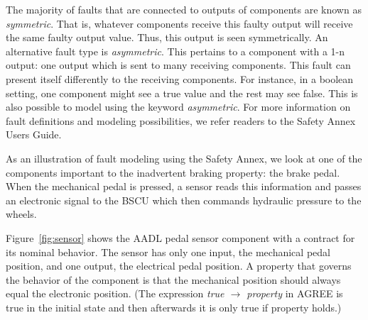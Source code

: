 The majority of faults that are connected to outputs of components are known as \textit{symmetric}. That is, whatever components receive this faulty output will receive the same faulty output value. Thus, this output is seen symmetrically. An alternative fault type is \textit{asymmetric}. This pertains to a component with a 1-n output: one output which is sent to many receiving components. This fault can present itself differently to the receiving components. For instance, in a boolean setting, one component might see a true value and the rest may see false. This is also possible to model using the keyword \textit{asymmetric}. For more information on fault definitions and modeling possibilities, we refer readers to the Safety Annex Users Guide\cite{SAGithub}.

As an illustration of fault modeling using the Safety Annex, we look at one of the components important to the inadvertent braking property: the brake pedal. When the mechanical pedal is pressed, a sensor reads this information and passes an electronic signal to the BSCU which then commands hydraulic pressure to the wheels. 

Figure~\ref{fig:sensor} shows the AADL pedal sensor component with a contract for its nominal behavior. The sensor has only one input, the mechanical pedal position, and one output, the electrical pedal position. 
A property that governs the behavior of the component is that the mechanical position should always equal the electronic position. (The expression \textit{true $\rightarrow$ property} in AGREE is true in the initial state and then afterwards it is only true if property holds.)

